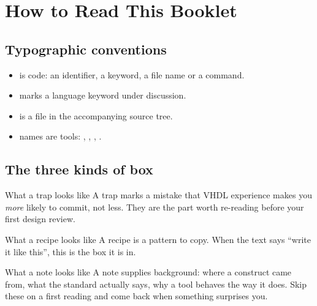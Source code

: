 \chapter*{How to Read This Booklet}

\section*{Typographic conventions}

\begin{itemize}
  \item {} is code: an identifier, a keyword, a file name
        or a command.
  \item {} marks a language keyword under
        discussion.
  \item {} is a file in the accompanying source
        tree.
  \item {} names are tools: , ,
        , .
\end{itemize}

\section*{The three kinds of box}

\begin{gotcha}{What a trap looks like}
A trap marks a mistake that VHDL experience makes you \emph{more} likely to
commit, not less. They are the part worth re-reading before your first
design review.
\end{gotcha}

\begin{tipbox}{What a recipe looks like}
A recipe is a pattern to copy. When the text says ``write it like this'',
this is the box it is in.
\end{tipbox}

\begin{notebox}{What a note looks like}
A note supplies background: where a construct came from, what the standard
actually says, why a tool behaves the way it does. Skip these on a first
reading and come back when something surprises you.
\end{notebox}

